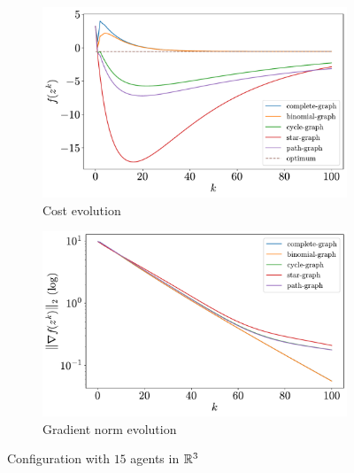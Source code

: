 \documentclass[a4paper,11pt,oneside]{book}
\begin{document}
\begin{figure}[H]
      \centering
      \begin{subfigure}[t]{0.49\textwidth}
            \centering
            \includegraphics[width=\linewidth]{./figs/quadratic/cost_15_3_100.pdf} 
            \caption{Cost evolution}
      \end{subfigure}
      \hfill
      \begin{subfigure}[t]{0.49\textwidth}
            \centering
            \includegraphics[width=\linewidth]{./figs/quadratic/gradient_15_3_100.pdf} 
            \caption{Gradient norm evolution}
      \end{subfigure}
      \caption{Configuration with $15$ agents in ${\mathbb{R}}^{3}$}
      \label{fig:quadratic_15_3}
\end{figure}
\end{document}
